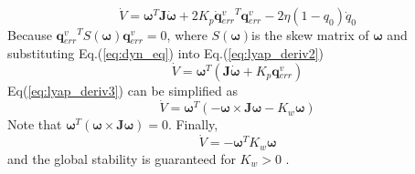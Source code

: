\documentclass[journal]{new-aiaa}
\begin{document}
\begin{equation}
\dot{V}=\boldsymbol{\omega}^{{T}} \mathbf{J}\dot{\boldsymbol{\omega}}
+2 K_p 
\dot{\textbf{q}}{_{err}^v}^T
\mathbf{q}{_{err}^v}
-2 \eta\left(1-q_0\right) \dot{q}_{0}
\label{eq:lyap_deriv2}
\end{equation}
Because ${\mathbf{q}{_{err}^v}^T} S(\boldsymbol{\omega})
\mathbf{q}{_{err}^v}=0$, where $S(\boldsymbol{\omega}) $is the skew matrix of $\boldsymbol{\omega}$ and substituting Eq.(\ref{eq:dyn_eq}) into Eq.(\ref{eq:lyap_deriv2})
\begin{equation}
\dot{V}=\boldsymbol{\omega}^{{T}} (\mathbf{J}\dot{\boldsymbol{\omega}}
+K_p 
\mathbf{q}{_{err}^v})
\label{eq:lyap_deriv3}
\end{equation}
Eq(\ref{eq:lyap_deriv3}) can be simplified as
\begin{equation}
\dot{V}=\boldsymbol{\omega}^{T} (
-\boldsymbol{\omega} \times \textbf{J} \boldsymbol{\omega}
-K_w \boldsymbol{\omega})
\end{equation}
Note that $\boldsymbol{\omega}^{T} (\boldsymbol{\omega} \times \textbf{J} \boldsymbol{\omega})=0$. Finally,
\begin{equation}
\dot{V}=-\boldsymbol{\omega}^{T} 
K_w \boldsymbol{\omega}
\label{eq:lyap_der_final}
\end{equation}
and the global stability is guaranteed for $K_w>0$ \cite{kalman}.
\end{document}
